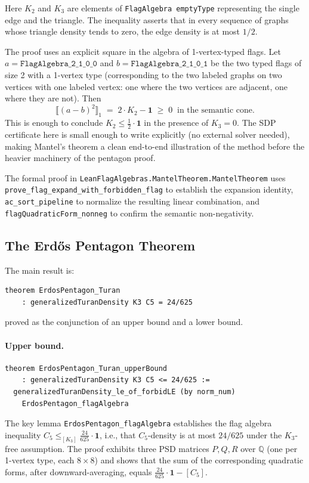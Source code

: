 \documentclass{article}
\newcommand{\lean}[1]{\texttt{#1}}
\begin{document}
Here $K_2$ and $K_3$ are elements of \lean{FlagAlgebra emptyType} representing the
single edge and the triangle.  The inequality asserts that in every sequence
of graphs whose triangle density tends to zero, the edge density is at most
$1/2$.

The proof uses an explicit square in the algebra of 1-vertex-typed flags.
Let $a = \lean{FlagAlgebra\_2\_1\_0\_0}$ and $b = \lean{FlagAlgebra\_2\_1\_0\_1}$
be the two typed flags of size 2 with a 1-vertex type (corresponding to
the two labeled graphs on two vertices with one labeled vertex: one where the
two vertices are adjacent, one where they are not).
Then
\[
  \bigl\llbracket (a - b)^2 \bigr\rrbracket_1
  \;=\;
  2 \cdot K_2 - \mathbf{1}
  \;\geq\; 0
  \;\;\text{in the semantic cone.}
\]
This is enough to conclude $K_2 \leq \frac{1}{2} \cdot \mathbf{1}$ in the
presence of $K_3 = 0$.  The SDP certificate here is small enough to write
explicitly (no external solver needed), making Mantel's theorem a clean
end-to-end illustration of the method before the heavier machinery of the
pentagon proof.

The formal proof in \lean{LeanFlagAlgebras.MantelTheorem.MantelTheorem} uses
\lean{prove\_flag\_expand\_with\_forbidden\_flag} to establish the expansion
identity, \lean{ac\_sort\_pipeline} to normalize the resulting linear
combination, and \lean{flagQuadraticForm\_nonneg} to confirm the semantic
non-negativity.

\subsection{The Erd\H{o}s Pentagon Theorem}

The main result is:
\begin{lstlisting}
theorem ErdosPentagon_Turan
    : generalizedTuranDensity K3 C5 = 24/625
\end{lstlisting}
proved as the conjunction of an upper bound and a lower bound.

\paragraph{Upper bound.}
\begin{lstlisting}
theorem ErdosPentagon_Turan_upperBound
    : generalizedTuranDensity K3 C5 <= 24/625 :=
  generalizedTuranDensity_le_of_forbidLE (by norm_num)
    ErdosPentagon_flagAlgebra
\end{lstlisting}
The key lemma \lean{ErdosPentagon\_flagAlgebra} establishes the flag algebra
inequality $C_5 \leq_{[K_3]} \frac{24}{625} \cdot \mathbf{1}$, i.e., that
$C_5$-density is at most $24/625$ under the $K_3$-free assumption.
The proof exhibits three PSD matrices $P, Q, R$ over $\mathbb{Q}$
(one per 1-vertex type, each $8\times 8$) and shows that the sum of the
corresponding quadratic forms, after downward-averaging, equals
$\frac{24}{625} \cdot \mathbf{1} - [C_5]$.
\end{document}
